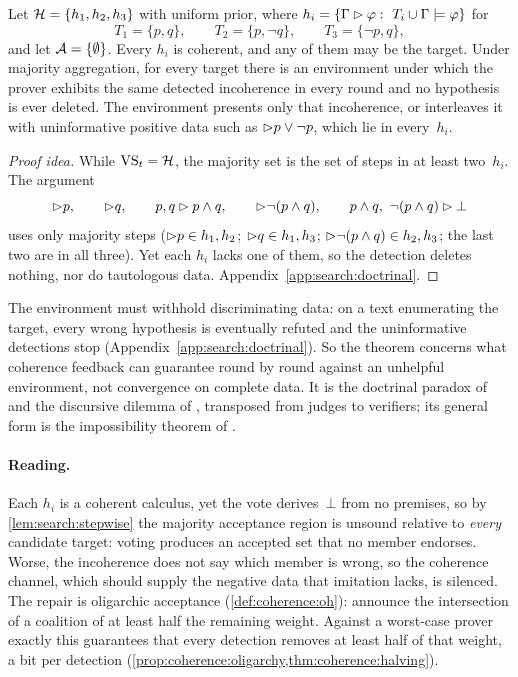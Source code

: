 \begin{theorem}\label{thm:search:doctrinal}
Let $\mathcal{H}=\{h_1,h_2,h_3\}$ with uniform prior, where $h_i=\{\Gamma\step\varphi:\ T_i\cup\Gamma\models\varphi\}$ for
\[
T_1=\{p,q\},\qquad T_2=\{p,\neg q\},\qquad T_3=\{\neg p,q\},
\]
and let $\mathcal{A}=\{\emptyset\}$. Every $h_i$ is coherent, and any of them may be the target. Under majority aggregation, for every target there is an environment under which the prover exhibits the same detected incoherence in every round and no hypothesis is ever deleted. The environment presents only that incoherence, or interleaves it with uninformative positive data such as $\rhd p\vee\neg p$, which lie in every~$h_i$.
\hspace*{\fill}\allowbreak\hspace*{\fill}
\end{theorem}

\begin{proof}[Proof idea]
While $\mathrm{VS}_t=\mathcal{H}$, the majority set is the set of steps in at least two~$h_i$. The argument
\[
\step p,\qquad \step q,\qquad p,q\step p\wedge q,\qquad \step\neg(p\wedge q),\qquad p\wedge q,\ \neg(p\wedge q)\step\bot
\]
uses only majority steps ($\rhd p\in h_1,h_2$; $\rhd q\in h_1,h_3$; $\rhd\neg(p\wedge q)\in h_2,h_3$; the last two are in all three). Yet each $h_i$ lacks one of them, so the detection deletes nothing, nor do tautologous data. Appendix~\ref{app:search:doctrinal}.
\end{proof}

The environment must withhold discriminating data: on a text enumerating the target, every wrong hypothesis is eventually refuted and the uninformative detections stop (Appendix~\ref{app:search:doctrinal}). So the theorem concerns what coherence feedback can guarantee round by round against an unhelpful environment, not convergence on complete data. It is the doctrinal paradox of \citet{kornhauser1986unpacking} and the discursive dilemma of \citet{pettit2001deliberative}, transposed from judges to verifiers; its general form is the impossibility theorem of \citet{list2002aggregating}.

\paragraph{Reading.}
Each $h_i$ is a coherent calculus, yet the vote derives~$\bot$ from no premises, so by \cref{lem:search:stepwise} the majority acceptance region is unsound relative to \emph{every} candidate target: voting produces an accepted set that no member endorses. Worse, the incoherence does not say which member is wrong, so the coherence channel, which should supply the negative data that imitation lacks, is silenced. The repair is oligarchic acceptance (\cref{def:coherence:oh}): announce the intersection of a coalition of at least half the remaining weight. Against a worst-case prover exactly this guarantees that every detection removes at least half of that weight, a bit per detection (\cref{prop:coherence:oligarchy,thm:coherence:halving}).

